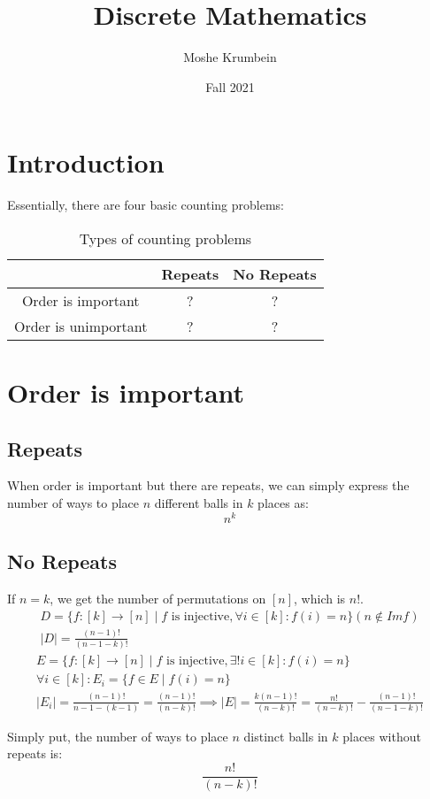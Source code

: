 \documentclass[00_complete]{subfiles}
\title{Discrete Mathematics}
\author{Moshe Krumbein}
\date{Fall 2021}
\begin{document}

\section{Introduction}

Essentially, there are four basic counting problems:
\begin{table}[ht]
\centering
{\renewcommand{\arraystretch}{1.2}%
\begin{tabular}{ccc}
 \hline
& Repeats & No Repeats \\
 \hline
    Order is important & ?&? \\
    Order is unimportant & ?&? \\
 \hline
\end{tabular}}
\caption{Types of counting problems}
\end{table}

\section{Order is important}
\subsection{Repeats}
When order is important but there are repeats, we can simply express the
number of ways to place $n$ different balls in $k$ places as:
$$n^k$$
\subsection{No Repeats}

If $n=k$, we get the number of permutations on $[n]$, which is $n!$.
\begin{gather*}
    D=\{f:[k]\to[n] \mid f \text{ is injective}, \forall i \in [k]: f(i)=n\} (n
    \notin Imf) \\
    |D|= \frac{(n-1)!}{(n-1-k)!}
\end{gather*}
\begin{gather*}
    E=\{f:[k]\to[n] \mid f \text{ is injective}, \exists! i \in [k]: f(i)=n\}
    \\
    \forall i \in[k]: E_i = \{f \in E \mid f(i) = n \} \\
    |E_i| =\frac{(n-1)!}{n-1-(k-1)} = \frac{(n-1)!}{(n-k)!} \implies |E| = \frac{k(n-1)!}{(n-k)!}
    = \frac{n!}{(n-k)!} - \frac{(n-1)!}{(n-1-k)!}
\end{gather*}

Simply put, the number of ways to place $n$ distinct balls in $k$ places
without repeats is:
$$\frac{n!}{(n-k)!}$$
\end{document}
